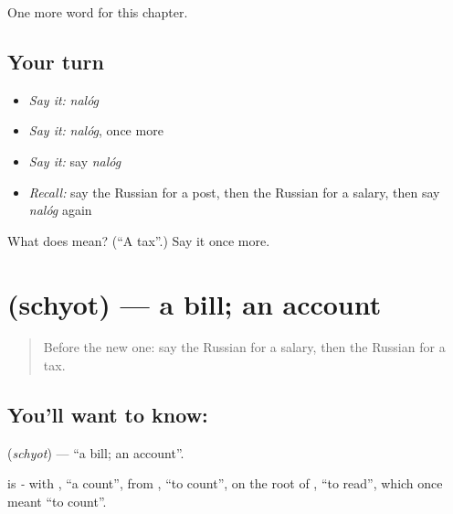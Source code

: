 \begin{grammarlens}[title={What you've built}]
One more word for this chapter.
\end{grammarlens}

\subsection*{Your turn}
\begin{itemize}
\raggedright
  \item \emph{Say it:} \emph{nalóg}
  \item \emph{Say it:} \emph{nalóg}, once more
  \item \emph{Say it:} say \emph{nalóg}
  \item \emph{Recall:} say the Russian for a post, then the Russian for a salary, then say \emph{nalóg} again
\end{itemize}

\begin{tcolorbox}[breakable,colback=teal!4,colframe=teal!35!black,title={Before you move on}]
What does  mean? (\textquotedblleft{}A tax\textquotedblright{}.) Say it once more.
\end{tcolorbox}
\section[\texorpdfstring{\ru{счёт} (schyot)}{счёт (schyot)}]{ (schyot) — a bill; an account}

\label{lesson:RU-C170-schyot}



\begin{quote}
Before the new one: say the Russian for a salary, then the Russian for a tax.
\end{quote}

\subsection*{You'll want to know: }
\textbf{} (\emph{schyot}) — \textquotedblleft{}a bill; an account\textquotedblright{}.

\begin{cousinweb}
\textbf{} is \emph{-} with \emph{}, \textquotedblleft{}a count\textquotedblright{}, from \emph{}, \textquotedblleft{}to count\textquotedblright{}, on the root of \emph{}, \textquotedblleft{}to read\textquotedblright{}, which once meant \textquotedblleft{}to count\textquotedblright{}.
\end{cousinweb}

